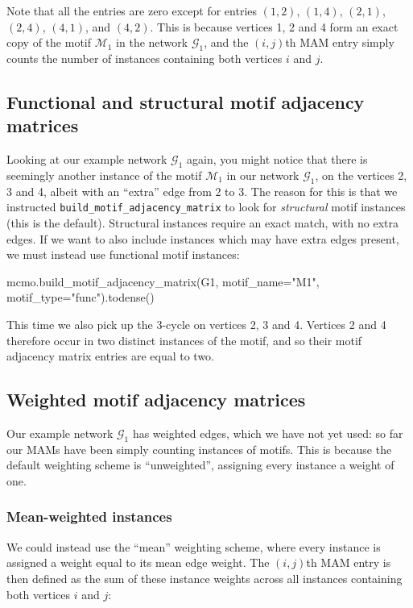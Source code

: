 \documentclass{article}
\begin{document}
Note that all the entries are zero except for entries
$(1,2)$,
$(1,4)$,
$(2,1)$,
$(2,4)$,
$(4,1)$,
and
$(4,2)$.
This is because vertices 1, 2 and 4 form an exact copy of
the motif $\mathcal{M}_1$ in the network $\mathcal{G}_1$,
and the  $(i,j)$th MAM entry simply counts the number of instances
containing both vertices $i$ and $j$.

\subsection{Functional and structural motif adjacency matrices}

Looking at our example network $\mathcal{G}_1$ again,
you might notice that there is seemingly another instance
of the motif $\mathcal{M}_1$
in our network $\mathcal{G}_1$,
on the vertices 2, 3 and 4,
albeit with an ``extra'' edge from 2 to 3.
The reason for this is that we instructed
\texttt{build\_motif\_adjacency\_matrix}
to look for \emph{structural} motif instances (this is the default).
Structural instances require an exact match, with no extra edges.
If we want to also include instances which may have extra edges present,
we must instead use functional motif instances:


\begin{pyconsole}
mcmo.build_motif_adjacency_matrix(G1, motif_name="M1",
  motif_type="func").todense()
\end{pyconsole}

This time we also pick up the 3-cycle on vertices 2, 3 and 4.
Vertices 2 and 4 therefore occur in two distinct instances
of the motif, and so their motif adjacency matrix entries are equal
to two.

\subsection{Weighted motif adjacency matrices}

Our example network $\mathcal{G}_1$ has weighted edges,
which we have not yet used:
so far our MAMs have been simply counting
instances of motifs.
This is because the default weighting scheme is
``unweighted'', assigning every instance a weight of one.

\subsubsection{Mean-weighted instances}

We could instead use the ``mean'' weighting scheme,
where every instance is assigned a weight equal to its
mean edge weight.
The $(i,j)$th MAM entry is then defined as the sum of these
instance weights across all instances containing
both vertices $i$ and $j$:
\end{document}
